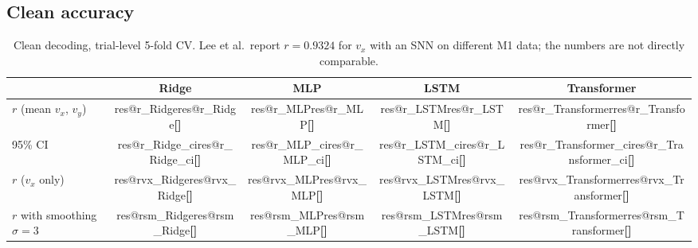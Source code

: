 \documentclass[11pt,a4paper]{article}
\makeatletter
\newcommand{\res}[1]{\ifcsname res@#1\endcsname\csname res@#1\endcsname\else\textbf{\textcolor{red!70!black}{[\texttt{\detokenize{#1}}]}}\fi}
\makeatother
\begin{document}
\subsection{Clean accuracy}
\begin{table}[H]\centering\small
\begin{tabular}{lcccc}\toprule
 & Ridge & MLP & LSTM & Transformer\\\midrule
$r$ (mean $v_x$, $v_y$) & \res{r_Ridge} & \res{r_MLP} & \res{r_LSTM} & \res{r_Transformer}\\
95\% CI & \res{r_Ridge_ci} & \res{r_MLP_ci} & \res{r_LSTM_ci} & \res{r_Transformer_ci}\\
$r$ ($v_x$ only) & \res{rvx_Ridge} & \res{rvx_MLP} & \res{rvx_LSTM} & \res{rvx_Transformer}\\
$r$ with smoothing $\sigma=3$ & \res{rsm_Ridge} & \res{rsm_MLP} & \res{rsm_LSTM} & \res{rsm_Transformer}\\\bottomrule
\end{tabular}
\caption{Clean decoding, trial-level 5-fold CV. Lee et al.\ report $r=0.9324$ for $v_x$ with an SNN on different M1
data; the numbers are not directly comparable.}\end{table}
\end{document}
